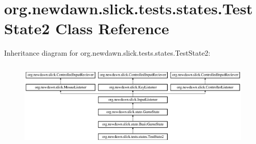 \hypertarget{classorg_1_1newdawn_1_1slick_1_1tests_1_1states_1_1_test_state2}{}\section{org.\+newdawn.\+slick.\+tests.\+states.\+Test\+State2 Class Reference}
\label{classorg_1_1newdawn_1_1slick_1_1tests_1_1states_1_1_test_state2}
Inheritance diagram for org.\+newdawn.\+slick.\+tests.\+states.\+Test\+State2\+:\begin{figure}[H]
\begin{center}
\leavevmode
\includegraphics[height=4.226415cm]{classorg_1_1newdawn_1_1slick_1_1tests_1_1states_1_1_test_state2}
\end{center}
\end{figure}
